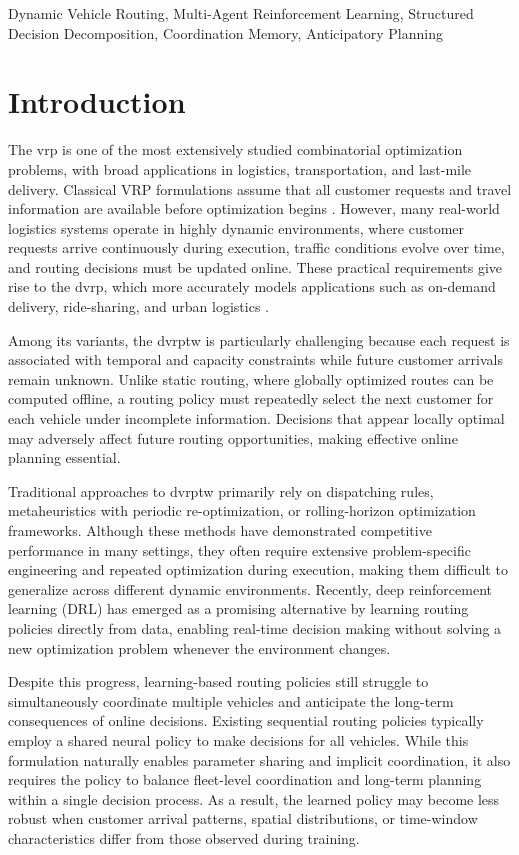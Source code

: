 \documentclass[conference]{IEEEtran}
\begin{document}
\begin{IEEEkeywords}
 Dynamic Vehicle Routing, Multi-Agent Reinforcement Learning, Structured Decision Decomposition, Coordination Memory, Anticipatory Planning
\end{IEEEkeywords}


\section{Introduction}\label{sec:intro}

The \gls{vrp} is one of the most extensively studied combinatorial optimization problems, with broad applications in logistics, transportation, and last-mile delivery. Classical VRP formulations assume that all customer requests and travel information are available before optimization begins \cite{toth2014vehicle}. However, many real-world logistics systems operate in highly dynamic environments, where customer requests arrive continuously during execution, traffic conditions evolve over time, and routing decisions must be updated online. These practical requirements give rise to the \gls{dvrp}, which more accurately models applications such as on-demand delivery, ride-sharing, and urban logistics \cite{psaraftis1988dynamic}.

Among its variants, the \gls{dvrptw} is particularly challenging because each request is associated with temporal and capacity constraints while future customer arrivals remain unknown. Unlike static routing, where globally optimized routes can be computed offline, a routing policy must repeatedly select the next customer for each vehicle under incomplete information. Decisions that appear locally optimal may adversely affect future routing opportunities, making effective online planning essential.

Traditional approaches to \gls{dvrptw} primarily rely on dispatching rules, metaheuristics with periodic re-optimization, or rolling-horizon optimization frameworks. Although these methods have demonstrated competitive performance in many settings, they often require extensive problem-specific engineering and repeated optimization during execution, making them difficult to generalize across different dynamic environments. Recently, deep reinforcement learning (DRL) has emerged as a promising alternative by learning routing policies directly from data, enabling real-time decision making without solving a new optimization problem whenever the environment changes.

Despite this progress, learning-based routing policies still struggle to simultaneously coordinate multiple vehicles and anticipate the long-term consequences of online decisions. Existing sequential routing policies typically employ a shared neural policy to make decisions for all vehicles. While this formulation naturally enables parameter sharing and implicit coordination, it also requires the policy to balance fleet-level coordination and long-term planning within a single decision process. As a result, the learned policy may become less robust when customer arrival patterns, spatial distributions, or time-window characteristics differ from those observed during training.
\end{document}
